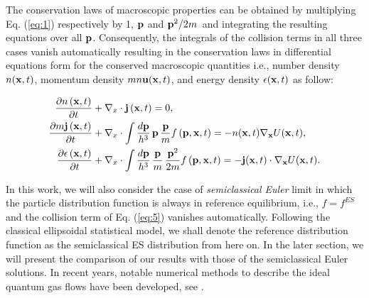 \documentclass{rsproca}%
\begin{document}
The conservation laws of macroscopic properties can be obtained by multiplying Eq. (\ref{eq:1}) respectively by 1, ${\bf p}$ and \({\bf p}^2/2m\)\, and integrating the resulting equations over all ${\bf p}$.  Consequently, the integrals of the collision terms in all three cases vanish automatically resulting in the conservation laws in differential equations form for the conserved macroscopic quantities i.e., number density \(n({\bf x},t)\), momentum density \(m n {\bf u}({\bf x},t)\), and energy density \(\epsilon({\bf x},t)\) as follow:

\begin{align}
\frac{\partial n\left({\bf x},t\right)}{\partial t}&+{\bf \nabla }_x\cdot{\bf j}\left({\bf x},t\right)=0, \\
\frac{\partial m\/{\bf j}\left({\bf x},t\right)}{\partial t}&+{\bf \nabla }_x\cdot\int{\frac{d{\bf p}}{h^3}}\,{\bf p}\,\frac{\bf p}{m}f\left({\bf p},{\bf x},t\right)= -n({\bf x},t){\bf \nabla}_{\bf x}U({\bf x},t), \\
\frac{\partial \epsilon \left({\bf x},t\right)}{\partial t}&+{\bf \nabla }_x\cdot\int{\frac{d\bf p}{h^3}}\,\frac{\bf p}{m}\,\frac{{\bf p}^2}{2m}f\left({\bf p},{\bf x},t\right)=-{\bf j}({\bf x},t)\cdot{\bf \nabla}_{\bf x}U({\bf x},t).
\end{align}

In this work, we will also consider the case of {\em semiclassical Euler} limit in which the particle distribution function is always in reference equilibrium, i.e., $f=f^{ES}$ and the collision term of Eq. (\ref{eq:5}) vanishes automatically.  Following the classical ellipsoidal statistical model, we shall denote the reference distribution function as the semiclassical ES distribution from here on.  In the later section, we will present the comparison of our results with those of the semiclassical Euler solutions.  In recent years, notable numerical methods to describe the ideal quantum gas flows have been developed, see \cite{1272832,Shi20089389,Jaw-YenYang05082006}.
\end{document}
